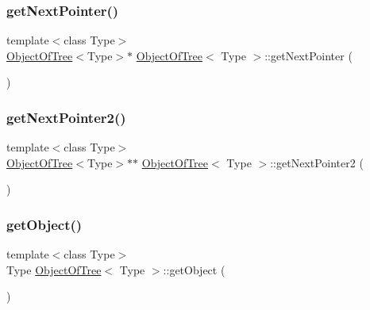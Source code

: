 \mbox{\label{class_object_of_tree_a596be7ee8c6e26a104bed5d26f7cf54e}} 
\subsubsection{\texorpdfstring{get\+Next\+Pointer()}{getNextPointer()}}
{\footnotesize\ttfamily template$<$class Type$>$ \\
\mbox{\hyperlink{class_object_of_tree}{Object\+Of\+Tree}}$<$Type$>$$\ast$ \mbox{\hyperlink{class_object_of_tree}{Object\+Of\+Tree}}$<$ Type $>$\+::get\+Next\+Pointer (\begin{DoxyParamCaption}{ }\end{DoxyParamCaption})\hspace{0.3cm}{\ttfamily [inline]}}

\mbox{\label{class_object_of_tree_a1b5839c677aa3c678733c1aa03d4f00f}} 
\subsubsection{\texorpdfstring{get\+Next\+Pointer2()}{getNextPointer2()}}
{\footnotesize\ttfamily template$<$class Type$>$ \\
\mbox{\hyperlink{class_object_of_tree}{Object\+Of\+Tree}}$<$Type$>$$\ast$$\ast$ \mbox{\hyperlink{class_object_of_tree}{Object\+Of\+Tree}}$<$ Type $>$\+::get\+Next\+Pointer2 (\begin{DoxyParamCaption}{ }\end{DoxyParamCaption})\hspace{0.3cm}{\ttfamily [inline]}}

\mbox{\label{class_object_of_tree_a28214e15fffb72cb50b764e2f3ac863d}} 
\subsubsection{\texorpdfstring{get\+Object()}{getObject()}}
{\footnotesize\ttfamily template$<$class Type$>$ \\
Type \mbox{\hyperlink{class_object_of_tree}{Object\+Of\+Tree}}$<$ Type $>$\+::get\+Object (\begin{DoxyParamCaption}{ }\end{DoxyParamCaption})\hspace{0.3cm}{\ttfamily [inline]}}

